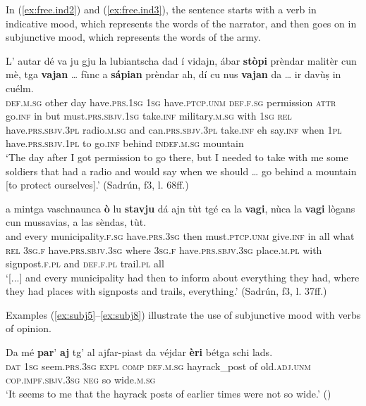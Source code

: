 In (\ref{ex:free.ind2}) and (\ref{ex:free.ind3}), the sentence starts with a verb in indicative mood, which represents the words of the narrator, and then goes on in subjunctive mood, which represents the words of the army.

\ea
\label{ex:free.ind2}
\gll  L’ autar dé va ju gju la lubiantscha dad í vidajn, ábar \textbf{stòpi} prèndar malitèr cun mè, tga \textbf{vajan} … fùnc a \textbf{sápian} prèndar ah, dí cu nus \textbf{vajan} da … ir davùṣ in cuélm.\\
\textsc{def.m.sg} other day have.\textsc{prs.1sg} \textsc{1sg} have.\textsc{ptcp.unm} \textsc{def.f.sg} permission \textsc{attr} go.\textsc{inf} in but must.\textsc{prs.sbjv.1sg}  take.\textsc{inf} military.\textsc{m.sg} with \textsc{1sg} \textsc{rel} have.\textsc{prs.sbjv.3pl} {} radio.\textsc{m.sg} and can.\textsc{prs.sbjv.3pl} take.\textsc{inf} eh say.\textsc{inf} when \textsc{1pl} have.\textsc{prs.sbjv.1pl} to {} go.\textsc{inf} behind \textsc{indef.m.sg} mountain\\
\glt `The day after I got permission to go there, but I needed to take with me some soldiers that had a radio and would say when we should … go behind a mountain [to protect ourselves].' (Sadrún, f3, l. 68ff.)
\z

\ea
\label{ex:free.ind3}
\gll [...] a mintga vaschnaunca \textbf{ò} lu \textbf{stavju} dá ajn tùt tgé ca la \textbf{vagi}, nùca la \textbf{vagi} lògans cun mussavias, a las sèndas, tùt.\\
{} and every municipality.\textsc{f.sg} have.\textsc{prs.3sg} then must.\textsc{ptcp.unm} give.\textsc{inf} in all what \textsc{rel} \textsc{3sg.f} have.\textsc{prs.sbjv.3sg} where \textsc{3sg.f} have.\textsc{prs.sbjv.3sg} place.\textsc{m.pl} with signpost.\textsc{f.pl} and \textsc{def.f.pl} trail.\textsc{pl} all \\
\glt `[...] and every municipality had then to inform about everything they had, where they had places with signposts and trails, everything.' (Sadrún, f3, l. 37ff.)
\z

Examples (\ref{ex:subj5}--\ref{ex:subj8}) illustrate the use of subjunctive mood with verbs of opinion.

\ea
\label{ex:subj5}
\gll  Da mé \textbf{par}' \textbf{aj} tg' al ajfar-piast da véjdar \textbf{èri} bétga schi lads.\\
\textsc{dat} \textsc{1sg} seem.\textsc{prs.3sg} \textsc{expl} \textsc{comp} \textsc{def.m.sg} hayrack\_post  of old.\textsc{adj.unm} \textsc{cop.impf.sbjv.3sg} \textsc{neg} so wide.\textsc{m.sg} \\
\glt `It seems to me that the hayrack posts of earlier times were not so wide.' ()
\z

